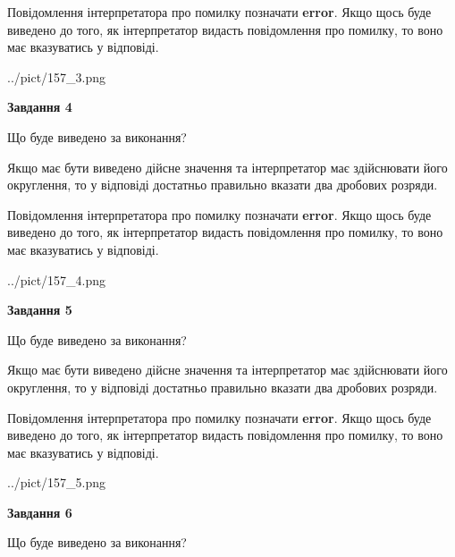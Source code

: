 \documentclass[12pt, ukrainian]{article}
\begin{document}
{\begin {Large}
Повідомлення інтерпретатора про помилку позначати \textbf{error}.
Якщо щось буде виведено до того, як інтерпретатор видасть повідомлення про помилку, 
то воно має вказуватись у відповіді. \par

\begin{center}
	{../pict/157_3.png}
\end{center}
\newpage

{\begin {center}\textbf{Завдання 4}\end {center}}\par
Що буде виведено за виконання? \par

Якщо має бути виведено дійсне значення та інтерпретатор має здійснювати його округлення, 
то у відповіді достатньо правильно вказати два дробових розряди.

Повідомлення інтерпретатора про помилку позначати \textbf{error}.
Якщо щось буде виведено до того, як інтерпретатор видасть повідомлення про помилку, 
то воно має вказуватись у відповіді. \par

\begin{center}
	{../pict/157_4.png}
\end{center}
\newpage

{\begin {center}\textbf{Завдання 5}\end {center}}\par
Що буде виведено за виконання? \par

Якщо має бути виведено дійсне значення та інтерпретатор має здійснювати його округлення, 
то у відповіді достатньо правильно вказати два дробових розряди.

Повідомлення інтерпретатора про помилку позначати \textbf{error}.
Якщо щось буде виведено до того, як інтерпретатор видасть повідомлення про помилку, 
то воно має вказуватись у відповіді. \par

\begin{center}
	{../pict/157_5.png}
\end{center}
\newpage

{\begin {center}\textbf{Завдання 6}\end {center}}\par
Що буде виведено за виконання? \par


\end{Large}}
\end{document}
